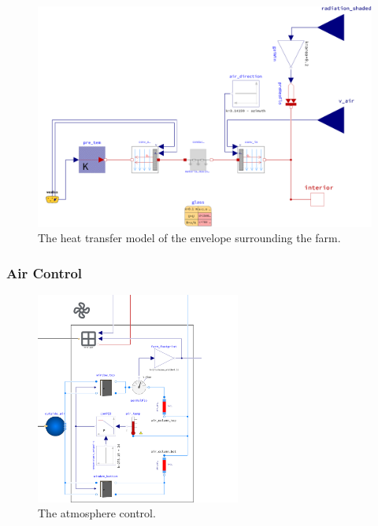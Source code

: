 
\begin{figure}[htbp]
  \centering
  \includegraphics[width=\textwidth]{img/simulation/envelope.pdf}
  \caption{The heat transfer model of the envelope surrounding the farm.}
  \label{fig:envelope}
\end{figure}


\subsubsection{Air Control}
\begin{figure}
    \centering
	\includegraphics[width=0.6\textwidth]{img/simulation/atmosphere.pdf}
	\caption{The atmosphere control.}
	\label{wfig:atmosphere}
\end{figure} 

